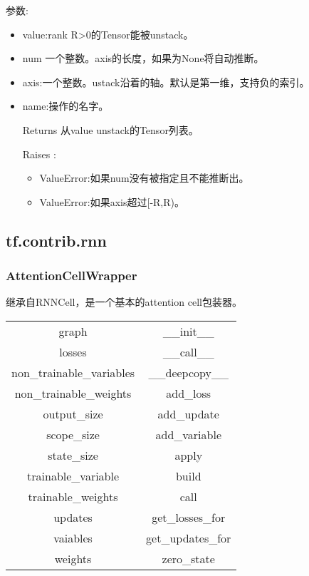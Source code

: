 参数:
\begin{itemize}
\item value:rank R>0的Tensor能被unstack。
\item num 一个整数。axis的长度，如果为None将自动推断。
\item axis:一个整数。ustack沿着的轴。默认是第一维，支持负的索引。
\item name:操作的名字。
\item[Returns] 从value unstack的Tensor列表。
\item[Raises]:
\begin{itemize}
\item ValueError:如果num没有被指定且不能推断出。
\item ValueError:如果axis超过[-R,R)。
\end{itemize}
\end{itemize}
\subsection{tf.contrib.rnn}
\subsubsection{AttentionCellWrapper}
继承自RNNCell，是一个基本的attention cell包装器。\newline
\begin{tabular}{|c|c|}
	graph&\_\_init\_\_\\
	losses&\_\_call\_\_\\
	non\_trainable\_variables&\_\_deepcopy\_\_\\
	non\_trainable\_weights&add\_loss\\
	output\_size&add\_update\\
	scope\_size&add\_variable\\
	state\_size&apply\\
	trainable\_variable&build\\
	trainable\_weights&call\\
	updates&get\_losses\_for\\
	vaiables&get\_updates\_for\\
	weights&zero\_state\\
\end{tabular}
